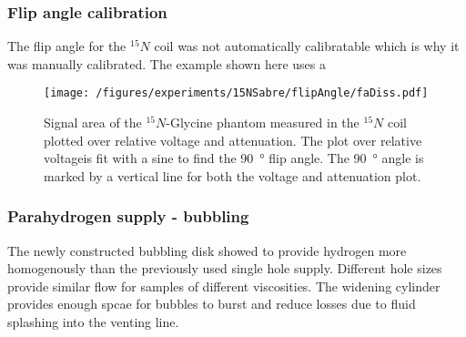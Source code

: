         \subsubsection{Flip angle calibration}
            The flip angle for the $^{15}N$ coil was not automatically calibratable which is why it was manually calibrated. The example shown here uses a 
            \begin{figure}
                \texttt{[image: /figures/experiments/15NSabre/flipAngle/faDiss.pdf]}
                \caption[Flip angle calibratin 15N]{Signal area of the $^{15}N$-Glycine phantom measured in the $^{15}N$ coil plotted over relative voltage and attenuation. The plot over relative voltageis fit with a sine to find the \SI{90}{\degree} flip angle. The \SI{90}{\degree} angle is marked by a vertical line for both the voltage and attenuation plot.}
                \label{fig:results:15N:flipAngle}
            \end{figure}
        \subsubsection{Parahydrogen supply - bubbling}
            The newly constructed bubbling disk showed to provide hydrogen more homogenously than the previously used single hole supply. Different hole sizes provide similar flow for samples of different viscosities. The widening cylinder provides enough spcae for bubbles to burst and reduce losses due to fluid splashing into the venting line.
